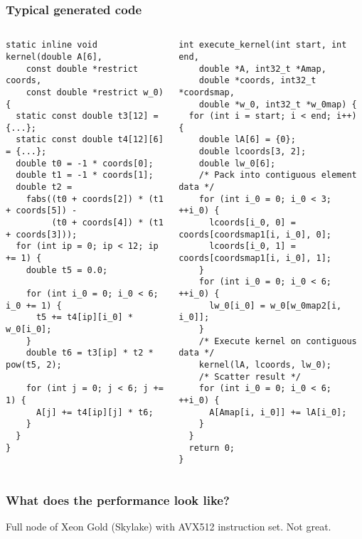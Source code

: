 \documentclass[presentation,aspectratio=43,10pt]{beamer}
\begin{document}
\begin{frame}[fragile]
  \frametitle{Typical generated code}
  \begin{columns}
    \begin{column}{0.5\textwidth}
\begin{verbatim}
static inline void kernel(double A[6],
    const double *restrict coords,
    const double *restrict w_0) {
  static const double t3[12] = {...};
  static const double t4[12][6] = {...};
  double t0 = -1 * coords[0];
  double t1 = -1 * coords[1];
  double t2 =
    fabs((t0 + coords[2]) * (t1 + coords[5]) -
         (t0 + coords[4]) * (t1 + coords[3]));
  for (int ip = 0; ip < 12; ip += 1) {
    double t5 = 0.0;

    for (int i_0 = 0; i_0 < 6; i_0 += 1) {
      t5 += t4[ip][i_0] * w_0[i_0];
    }
    double t6 = t3[ip] * t2 * pow(t5, 2);

    for (int j = 0; j < 6; j += 1) {
      A[j] += t4[ip][j] * t6;
    }
  }
}
\end{verbatim}
    \end{column}
    \begin{column}{0.5\textwidth}
\begin{verbatim}
int execute_kernel(int start, int end,
    double *A, int32_t *Amap,
    double *coords, int32_t *coordsmap,
    double *w_0, int32_t *w_0map) {
  for (int i = start; i < end; i++) {
    double lA[6] = {0};
    double lcoords[3, 2];
    double lw_0[6];
    /* Pack into contiguous element data */
    for (int i_0 = 0; i_0 < 3; ++i_0) {
      lcoords[i_0, 0] = coords[coordsmap1[i, i_0], 0];
      lcoords[i_0, 1] = coords[coordsmap1[i, i_0], 1];
    }
    for (int i_0 = 0; i_0 < 6; ++i_0) {
      lw_0[i_0] = w_0[w_0map2[i, i_0]];
    }
    /* Execute kernel on contiguous data */
    kernel(lA, lcoords, lw_0);
    /* Scatter result */
    for (int i_0 = 0; i_0 < 6; ++i_0) {
      A[Amap[i, i_0]] += lA[i_0];
    }
  }
  return 0;
}
\end{verbatim}
    \end{column}
  \end{columns}
\end{frame}

\begin{frame}
  \frametitle{What does the performance look like?}
  \begin{center}
    Full node of Xeon Gold (Skylake) with AVX512 instruction set.
    Not great.
  \end{center}
\end{frame}
\end{document}

